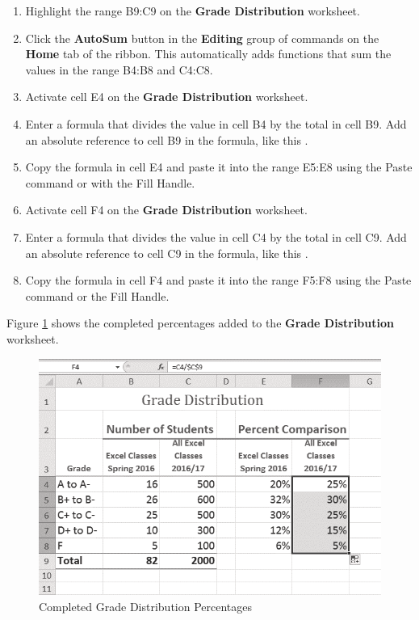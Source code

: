 \begin{enumerate}
	\item Highlight the range \textsf{B9:C9} on the \textbf{Grade Distribution} worksheet.
	\item Click the \textbf{AutoSum} button in the \textbf{Editing} group of commands on the \textbf{Home} tab of the ribbon. This automatically adds  functions that sum the values in the range \textsf{B4:B8} and \textsf{C4:C8}.
	\item Activate cell \textsf{E4} on the \textbf{Grade Distribution} worksheet.
	\item Enter a formula that divides the value in cell \textsf{B4} by the total in cell \textsf{B9}. Add an absolute reference to cell \textsf{B9} in the formula, like this .
	\item Copy the formula in cell \textsf{E4} and paste it into the range \textsf{E5:E8} using the Paste command or with the Fill Handle.
	\item Activate cell \textsf{F4} on the \textbf{Grade Distribution} worksheet.
	\item Enter a formula that divides the value in cell \textsf{C4} by the total in cell \textsf{C9}. Add an absolute reference to cell \textsf{C9} in the formula, like this .
	\item Copy the formula in cell \textsf{F4} and paste it into the range \textsf{F5:F8} using the Paste command or the Fill Handle.
\end{enumerate}

Figure \ref{04:fig16} shows the completed percentages added to the \textbf{Grade Distribution} worksheet.

\begin{figure}[H]
	\centering
	\includegraphics[width=\maxwidth{.95\linewidth}]{gfx/ch04_fig16}
	\caption{Completed Grade Distribution Percentages}
	\label{04:fig16}
\end{figure}

